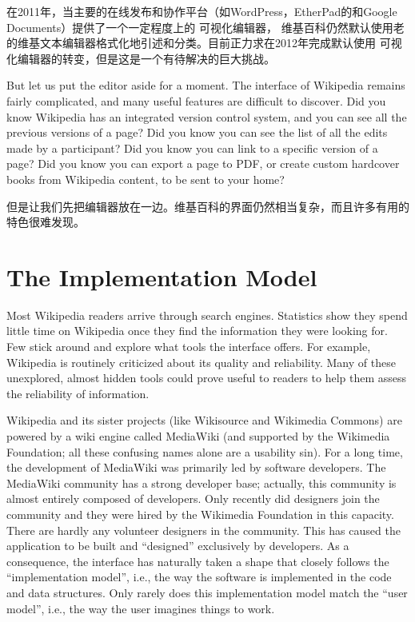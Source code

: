 在2011年，当主要的在线发布和协作平台（如WordPress，EtherPad的和Google Documents）提供了一个一定程度上的
可视化编辑器， 维基百科仍然默认使用老的维基文本编辑器格式化地引述和分类。目前正力求在2012年完成默认使用
可视化编辑器的转变，但是这是一个有待解决的巨大挑战。

But let us put the editor aside for a moment. The interface of Wikipedia remains
fairly complicated, and many useful features are difficult to discover. Did you
know Wikipedia has an integrated version control system, and you can see all
the previous versions of a page? Did you know you can see the list of all the
edits made by a participant? Did you know you can link to a specific version
of a page? Did you know you can export a page to PDF, or create custom
hardcover books from Wikipedia content, to be sent to your home?

但是让我们先把编辑器放在一边。维基百科的界面仍然相当复杂，而且许多有用的特色很难发现。

\section*{The Implementation Model}

Most Wikipedia readers arrive through search engines. Statistics show they spend
little time on Wikipedia once they find the information they were looking for.
Few stick around and explore what tools the interface offers. For example,
Wikipedia is routinely criticized about its quality and reliability. Many of
these unexplored, almost hidden tools could prove useful to readers to help them
assess the reliability of information.

Wikipedia and its sister projects (like Wikisource and Wikimedia Commons)
are powered by a wiki engine called MediaWiki
(and supported by the Wikimedia Foundation; all these confusing names alone are
a usability sin). For a long time, the development of MediaWiki was primarily
led by software developers. The MediaWiki community has a strong developer base;
actually, this community is almost entirely composed of developers. Only
recently did designers join the community and they were hired by the Wikimedia
Foundation in this capacity. There are hardly any volunteer designers in the
community. This has caused the application to be built and ``designed''
exclusively by developers. As a consequence, the interface has naturally taken a
shape that closely follows the ``implementation model'', i.e., the way the
software is implemented in the code and data structures. Only rarely does this
implementation model match the ``user model'', i.e., the way the user imagines
things to work.

